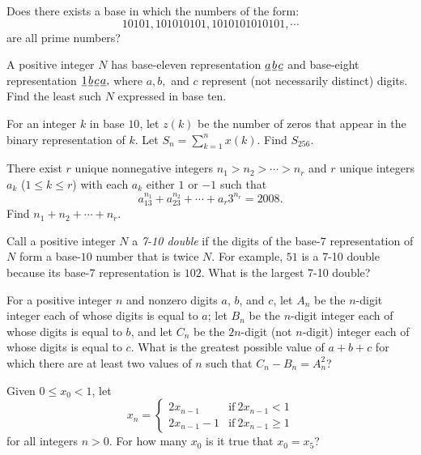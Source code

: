 \documentclass{article}
\begin{document}
\begin{prob}[PAMO 2003/3]{2}
Does there exists a base in which the numbers of the form:
\[ 10101, 101010101, 1010101010101,\cdots \]
are all prime numbers?
\end{prob}

\begin{prob}[AIME I 2020/3]{2}
A positive integer $N$ has base-eleven representation $\underline{a}\kern 0.1em\underline{b}\kern 0.1em\underline{c}$ and base-eight representation $\underline1\kern 0.1em\underline{b}\kern 0.1em\underline{c}\kern 0.1em\underline{a},$ where $a,b,$ and $c$ represent (not necessarily distinct) digits. Find the least such $N$ expressed in base ten.
\end{prob}

\begin{prob}[ARML 2000]{3}
For an integer $k$ in base $10$, let $z(k)$ be the number of zeros that appear in the binary representation of $k$. Let $S_n=\sum_{k=1}^n x(k)$. Find $S_{256}$. 
\end{prob}

\begin{prob}[AIME 2008 II/4]{3}
There exist $ r$ unique nonnegative integers $ n_1 > n_2 > \cdots > n_r$ and $ r$ unique integers $ a_k$ ($ 1\le k\le r$) with each $ a_k$ either $ 1$ or $ - 1$ such that
\[ a_13^{n_1} + a_23^{n_2} + \cdots + a_r3^{n_r} = 2008.
\]Find $ n_1 + n_2 + \cdots + n_r$.
\end{prob}

\begin{prob}[AIME I 2001/8]{3}
Call a positive integer $N$ a \textit{7-10 double} if the digits of the base-$7$ representation of $N$ form a base-$10$ number that is twice $N$. For example, $51$ is a 7-10 double because its base-$7$ representation is $102$. What is the largest 7-10 double?
\end{prob}

\begin{prob}[AMC 10A 2018/25]{4}
For a positive integer $n$ and nonzero digits $a$, $b$, and $c$, let $A_n$ be the $n$-digit integer each of whose digits is equal to $a$; let $B_n$ be the $n$-digit integer each of whose digits is equal to $b$, and let $C_n$ be the $2n$-digit (not $n$-digit) integer each of whose digits is equal to $c$. What is the greatest possible value of $a + b + c$ for which there are at least two values of $n$ such that $C_n - B_n = A_n^2$?
\end{prob}


\begin{prob}[AHSME 1993/30]{6}
Given $0 \le x_0 <1$, let
\[ x_n= 
     \begin{cases}
       2x_{n-1} & \text{if}\ 2x_{n-1} <1 \\
       2x_{n-1}-1 & \text{if}\ 2x_{n-1} \ge 1
     \end{cases} \]for all integers $n>0$. For how many $x_0$ is it true that $x_0=x_5$?
\end{prob}
\end{document}
